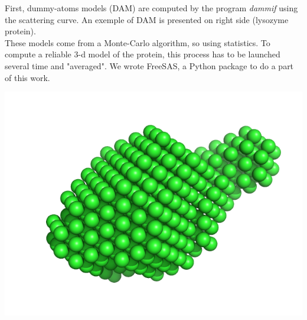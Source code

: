 \documentclass[11pt]{article}
\begin{document}
\vspace{-0.6cm}
\begin{minipage}{0.55\linewidth}
    First, dummy-atoms models (DAM) are computed by the program 
    \textit{dammif} using the scattering curve. 
    An exemple of DAM is presented on right side (lysozyme protein).\\
    These models come from a Monte-Carlo algorithm, so using statistics. 
    To compute a reliable 3-d model of the protein, this process has to 
    be launched several time and "averaged". 
    We wrote FreeSAS, a Python package to do a part of this work.

\end{minipage} \hfill
\begin{minipage}{0.4\linewidth}
    \begin{flushleft}
    \includegraphics[scale=0.3]{model.png}
    \end{flushleft}
\end{minipage}
\end{document}
